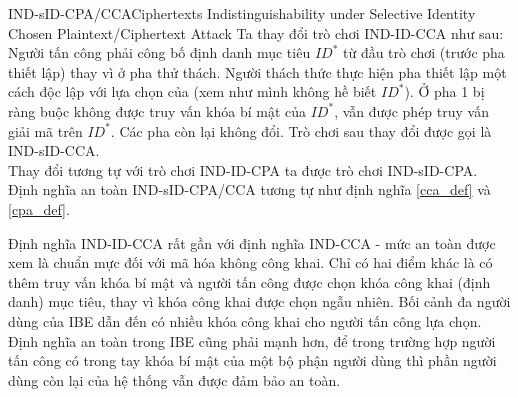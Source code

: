\documentclass[class=report, crop=false]{standalone}
\begin{document}
			\begin{game}{IND-sID-CPA/CCA}{Ciphertexts Indistinguishability under Selective Identity Chosen Plaintext/Ciphertext Attack}
				Ta thay đổi trò chơi IND-ID-CCA như sau: \\[0.2\baselineskip] \indent
				Người tấn công \adversary phải công bố định danh mục tiêu $ID^*$ từ đầu trò chơi (trước pha thiết lập) thay vì ở pha thử thách. Người thách thức \challenger thực hiện pha thiết lập một cách độc lập với lựa chọn của \adversary (\challenger xem như mình không hề biết $ID^*$). Ở pha 1 \adversary bị ràng buộc không được truy vấn khóa bí mật của $ID^*$, \challenger vẫn được phép truy vấn giải mã trên $ID^*$. Các pha còn lại không đổi. Trò chơi sau thay đổi được gọi là IND-sID-CCA. \\[0.2\baselineskip] \indent
				Thay đổi tương tự với trò chơi IND-ID-CPA ta được trò chơi IND-sID-CPA. \\ \indent
				Định nghĩa an toàn IND-sID-CPA/CCA tương tự như định nghĩa \ref{cca_def} và \ref{cpa_def}.
			\end{game}
			\begin{remark}
				Định nghĩa IND-ID-CCA rất gần với định nghĩa IND-CCA - mức an toàn được xem là chuẩn mực đối với mã hóa không công khai. Chỉ có hai điểm khác là có thêm truy vấn khóa bí mật và người tấn công được chọn khóa công khai (định danh) mục tiêu, thay vì khóa công khai được chọn ngẫu nhiên. Bối cảnh đa người dùng của IBE dẫn đến có nhiều khóa công khai cho người tấn công lựa chọn. Định nghĩa an toàn trong IBE cũng phải mạnh hơn, để trong trường hợp người tấn công có trong tay khóa bí mật của một bộ phận người dùng thì phần người dùng còn lại của hệ thống vẫn được đảm bảo an toàn.
			\end{remark}
\end{document}
